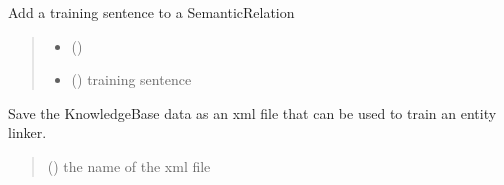 \documentclass[letterpaper,10pt,english]{sphinxmanual}
\begin{document}
\begin{fulllineitems}
\begin{fulllineitems}
\label{\detokenize{medextractor.knowledge:medextractor.knowledge.base.KnowledgeBase.add_training_example_to_relation}}
\pysigstartsignatures
{}
\pysigstopsignatures
\sphinxAtStartPar
Add a training sentence to a SemanticRelation
\begin{quote}\begin{description}
\begin{itemize}
\item {} 
\sphinxAtStartPar
{} ({\hyperref[\detokenize{medextractor.knowledge:medextractor.knowledge.semantics.SemanticRelation}]{}}) \textendash{} 

\item {} 
\sphinxAtStartPar
{} () \textendash{} training sentence

\end{itemize}

\end{description}\end{quote}

\end{fulllineitems}


\begin{fulllineitems}
\label{\detokenize{medextractor.knowledge:medextractor.knowledge.base.KnowledgeBase.export_for_entity_linker}}
\pysigstartsignatures
{}
\pysigstopsignatures
\sphinxAtStartPar
Save the KnowledgeBase data as an xml file that can be used to train an entity linker.
\begin{quote}\begin{description}
\sphinxAtStartPar
{} () \textendash{} the name of the xml file


\end{description}
\end{quote}
\end{fulllineitems}
\end{fulllineitems}
\end{document}

